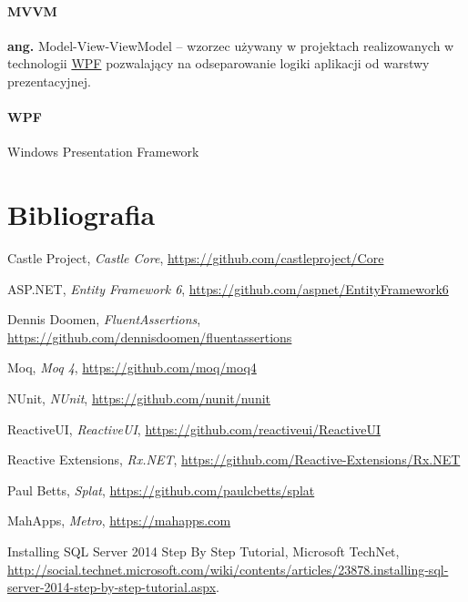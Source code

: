 \documentclass[10pt,a4paper]{article}
\begin{document}
\label{abbr:mvvm}
\paragraph{MVVM} \textbf{ang.} Model-View-ViewModel -- wzorzec używany w projektach realizowanych w technologii \hyperref[abbr:wpf]{WPF} pozwalający na odseparowanie logiki aplikacji od warstwy prezentacyjnej. 

\label{abbr:wpf}
\paragraph{WPF} Windows Presentation Framework

\renewcommand*{\refname}{\vspace*{-2em}}
\section{Bibliografia}
\begin{thebibliography}{99}

	Castle Project,
	\emph{Castle Core},
	\url{https://github.com/castleproject/Core}

	ASP.NET,
	\emph{Entity Framework 6},
	\url{https://github.com/aspnet/EntityFramework6}

	Dennis Doomen,
	\emph{FluentAssertions},
	\url{https://github.com/dennisdoomen/fluentassertions}

	Moq,
	\emph{Moq 4},
	\url{https://github.com/moq/moq4}

	NUnit,
	\emph{NUnit},
	\url{https://github.com/nunit/nunit}

	ReactiveUI,
	\emph{ReactiveUI},
	\url{https://github.com/reactiveui/ReactiveUI}

	Reactive Extensions,
	\emph{Rx.NET},
	\url{https://github.com/Reactive-Extensions/Rx.NET}

	Paul Betts,
	\emph{Splat},
	\url{https://github.com/paulcbetts/splat}

	MahApps,
	\emph{Metro},
	\url{https://mahapps.com}

	Installing SQL Server 2014 Step By Step Tutorial,
	Microsoft TechNet,
	\url{http://social.technet.microsoft.com/wiki/contents/articles/23878.installing-sql-server-2014-step-by-step-tutorial.aspx}.

\end{thebibliography}
\end{document}
